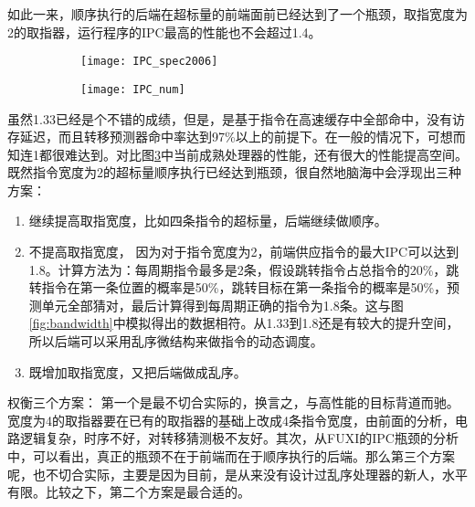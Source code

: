 	如此一来，顺序执行的后端在超标量的前端面前已经达到了一个瓶颈，取指宽度为2的取指器，运行程序的IPC最高的性能也不会超过1.4。
	\begin{figure}[!htbp]
		\centering
	    \begin{subfigure}[b]{\textwidth}
			\texttt{[image: IPC\_spec2006]}
			\caption{}
			\label{fig:ipc_cmp_fig}
		\end{subfigure}
		\begin{subfigure}[b]{\textwidth}
			\texttt{[image: IPC\_num]}
			\caption{}
			\label{fig:ipc_cmp_tbl}
		\end{subfigure}
		\label{fig:ipc_cmp}
	\end{figure}

	虽然1.33已经是个不错的成绩，但是，是基于指令在高速缓存中全部命中，没有访存延迟，而且转移预测器命中率达到97\%以上的前提下。在一般的情况下，可想而知连1都很难达到。对比图\ref{fig:ipc_cmp}中当前成熟处理器的性能，还有很大的性能提高空间。既然指令宽度为2的超标量顺序执行已经达到瓶颈，很自然地脑海中会浮现出三种方案：
	\begin{enumerate}[label=(\alph*)]
		\item 继续提高取指宽度，比如四条指令的超标量，后端继续做顺序。
		\item 不提高取指宽度， 因为对于指令宽度为2，前端供应指令的最大IPC可以达到1.8。计算方法为：每周期指令最多是2条，假设跳转指令占总指令的20\%，跳转指令在第一条位置的概率是50\%，跳转目标在第一条指令的概率是50\%，预测单元全部猜对，最后计算得到每周期正确的指令为1.8条。这与图\ref{fig:bandwidth}中模拟得出的数据相符。从1.33到1.8还是有较大的提升空间，所以后端可以采用乱序微结构来做指令的动态调度。
		\item 既增加取指宽度，又把后端做成乱序。
	\end{enumerate}

	权衡三个方案： 第一个是最不切合实际的，换言之，与高性能的目标背道而驰。宽度为4的取指器要在已有的取指器的基础上改成4条指令宽度，由前面的分析，电路逻辑复杂，时序不好，对转移猜测极不友好。其次，从FUXI的IPC瓶颈的分析中，可以看出，真正的瓶颈不在于前端而在于顺序执行的后端。那么第三个方案呢，也不切合实际，主要是因为目前，是从来没有设计过乱序处理器的新人，水平有限。比较之下，第二个方案是最合适的。

